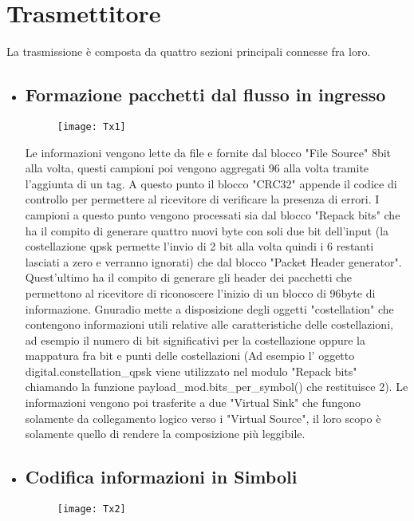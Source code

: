 \section{Trasmettitore}
 La trasmissione è composta da quattro sezioni principali connesse fra loro.
 \begin{itemize}
 	\item \subsection{Formazione pacchetti dal flusso in ingresso}
 	\begin{figure}[h]
 		\centering
 		\texttt{[image: Tx1]}
 		\caption{}
 	\end{figure}
 Le informazioni vengono lette da file e fornite dal blocco "File Source" 8bit alla volta, questi campioni poi vengono aggregati 96 alla volta tramite l'aggiunta di un tag. A questo punto il blocco "CRC32" appende il codice di controllo per permettere al ricevitore di verificare la presenza di errori. I campioni a questo punto vengono processati sia dal blocco "Repack bits" che ha il compito di generare quattro nuovi byte con soli due bit dell'input (la costellazione qpsk permette l'invio di 2 bit alla volta quindi i 6 restanti lasciati a zero e verranno ignorati) che dal blocco "Packet Header generator". Quest'ultimo ha il compito di generare gli header dei pacchetti che permettono al ricevitore di riconoscere l'inizio di un blocco di 96byte di informazione. Gnuradio mette a disposizione degli oggetti "costellation" che contengono informazioni utili relative alle caratteristiche delle costellazioni, ad esempio il numero di bit significativi per la costellazione oppure la mappatura fra bit e punti delle costellazioni (Ad esempio l' oggetto digital.constellation\_qpsk viene utilizzato nel modulo "Repack bits" chiamando la funzione payload\_mod.bits\_per\_symbol() che restituisce 2). Le informazioni vengono poi trasferite a due "Virtual Sink" che fungono solamente da collegamento logico verso i "Virtual Source", il loro scopo è solamente quello di rendere la composizione più leggibile.
 	\item \subsection{Codifica informazioni in Simboli}
 	\begin{figure}[h]
 		\centering
 		\texttt{[image: Tx2]}
 		\caption{}
 	\end{figure}

\end{itemize}
